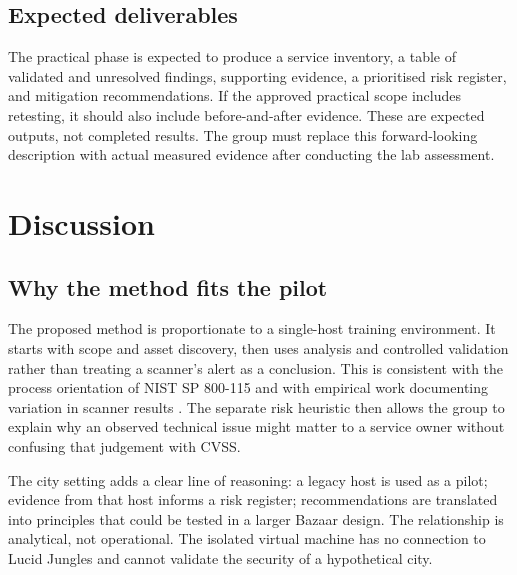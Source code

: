 \documentclass[11pt,a4paper]{article}
\begin{document}
\subsection{Expected deliverables}
The practical phase is expected to produce a service inventory, a table of validated and unresolved findings, supporting evidence, a prioritised risk register, and mitigation recommendations. If the approved practical scope includes retesting, it should also include before-and-after evidence. These are expected outputs, not completed results. The group must replace this forward-looking description with actual measured evidence after conducting the lab assessment.

\section{Discussion}
\subsection{Why the method fits the pilot}
The proposed method is proportionate to a single-host training environment. It starts with scope and asset discovery, then uses analysis and controlled validation rather than treating a scanner's alert as a conclusion. This is consistent with the process orientation of NIST SP 800-115 and with empirical work documenting variation in scanner results \citep{scarfone2008,alsaleh2017,alazmi2022}. The separate risk heuristic then allows the group to explain why an observed technical issue might matter to a service owner without confusing that judgement with CVSS.

The city setting adds a clear line of reasoning: a legacy host is used as a pilot; evidence from that host informs a risk register; recommendations are translated into principles that could be tested in a larger Bazaar design. The relationship is analytical, not operational. The isolated virtual machine has no connection to Lucid Jungles and cannot validate the security of a hypothetical city.
\end{document}
